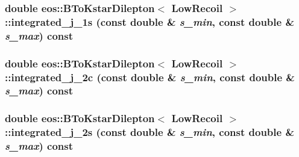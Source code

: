 \label{classeos_1_1BToKstarDilepton_3_01LowRecoil_01_4_a5d9d3e3290c20f4a7019bf449f6b0e62}
\hypertarget{classeos_1_1BToKstarDilepton_3_01LowRecoil_01_4_a7c4175068b4058ae02f5bf6c75106e45}{
\subsubsection[{integrated\_\-j\_\-1s}]{\setlength{\rightskip}{0pt plus 5cm}double eos::BToKstarDilepton$<$ {\bf LowRecoil} $>$::integrated\_\-j\_\-1s (const double \& {\em s\_\-min}, \/  const double \& {\em s\_\-max}) const}}
\label{classeos_1_1BToKstarDilepton_3_01LowRecoil_01_4_a7c4175068b4058ae02f5bf6c75106e45}
\hypertarget{classeos_1_1BToKstarDilepton_3_01LowRecoil_01_4_a6f81a72ab27c25c1f0946eb58ac037f5}{
\subsubsection[{integrated\_\-j\_\-2c}]{\setlength{\rightskip}{0pt plus 5cm}double eos::BToKstarDilepton$<$ {\bf LowRecoil} $>$::integrated\_\-j\_\-2c (const double \& {\em s\_\-min}, \/  const double \& {\em s\_\-max}) const}}
\label{classeos_1_1BToKstarDilepton_3_01LowRecoil_01_4_a6f81a72ab27c25c1f0946eb58ac037f5}
\hypertarget{classeos_1_1BToKstarDilepton_3_01LowRecoil_01_4_a69e2a4fa81e024ea433f7d1924bf261d}{
\subsubsection[{integrated\_\-j\_\-2s}]{\setlength{\rightskip}{0pt plus 5cm}double eos::BToKstarDilepton$<$ {\bf LowRecoil} $>$::integrated\_\-j\_\-2s (const double \& {\em s\_\-min}, \/  const double \& {\em s\_\-max}) const}}
\label{classeos_1_1BToKstarDilepton_3_01LowRecoil_01_4_a69e2a4fa81e024ea433f7d1924bf261d}
